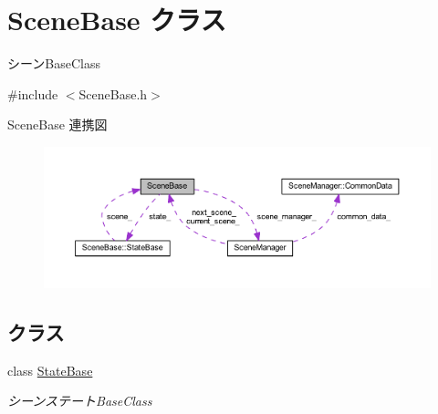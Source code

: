 \hypertarget{class_scene_base}{}\section{Scene\+Base クラス}
\label{class_scene_base}


シーン\+Base\+Class  




{\ttfamily \#include $<$Scene\+Base.\+h$>$}



Scene\+Base 連携図\nopagebreak
\begin{figure}[H]
\begin{center}
\leavevmode
\includegraphics[width=350pt]{class_scene_base__coll__graph}
\end{center}
\end{figure}
\subsection*{クラス}
\begin{DoxyCompactItemize}
\item 
class \mbox{\hyperlink{class_scene_base_1_1_state_base}{State\+Base}}
\begin{DoxyCompactList}\small\item\em シーンステート\+Base\+Class \end{DoxyCompactList}\end{DoxyCompactItemize}
